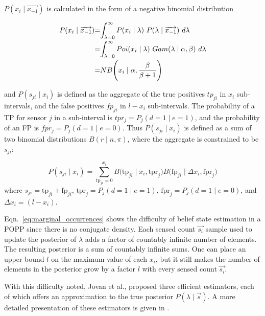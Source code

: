 $P(x_i \mid \overrightarrow{x_{-1}})$ is calculated in the form of a negative binomial distribution

\begin{equation}
	\label{eq:unconditional_xi}
	\begin{tabular}{r@{=}l}
		$P(x_i \mid \overrightarrow{x_{-1}})$ & $\displaystyle\int_{\lambda=0}^{\infty} P(x_i \mid \lambda) ~ P(\lambda \mid \overrightarrow{x_{-1}}) ~d\lambda$ \\ [2ex]
		& $\displaystyle\int_{\lambda=0}^{\infty} Poi(x_i \mid \lambda) ~ Gam(\lambda \mid \alpha, \beta) ~d\lambda$ \\ [2ex]
		& $NB\Bigg(x_i \mid \alpha, \displaystyle\frac{\beta}{\beta + 1}\Bigg)$
	\end{tabular}
\end{equation}

\noindent and $P(s_{ji} \mid x_i)$ is defined as the aggregate of the true positives $tp_{ji}$ in $x_i$ sub-intervals, and the false positives $fp_{ji}$ in $l-x_i$ sub-intervals. The probability of a TP for sensor $j$ in a sub-interval is $tpr_j = P_j(d = 1 \mid e=1)$, and the probability of an FP is $fpr_j = P_j(d = 1 \mid e=0)$. Thus $P(s_{ji} \mid x_i)$ is defined as a sum of two binomial distributions $B(r \mid n,\pi)$, where the aggregate is constrained to be $s_{ji}$: 

\begin{equation}
	\label{eq:joint_binomial_distribution}
    P(s_{ji} \mid x_i) \! = \! \! \! \displaystyle\sum_{\textrm{tp}_{ji} = 0}^{x_{i}} \! \! B\Big(\textrm{tp}_{ji} \mid x_i, \textrm{tpr}_j\Big) B\Big(\textrm{fp}_{ji} \mid \Delta x_i, \textrm{fpr}_j \Big)
\end{equation}
\noindent where $s_{ji} = \textrm{tp}_{ji} + \textrm{fp}_{ji}$, $\textrm{tpr}_j = P_j(d=1 \mid e=1)$, $\textrm{fpr}_j = P_j(d=1 \mid e=0)$, and $\Delta x_i = (l - x_i)$.

Eqn.~\ref{eq:marginal_occurrences} shows the difficulty of belief state estimation in a POPP since there is no conjugate density. Each sensed count $\overrightarrow{s_i}$ sample used to update the posterior of $\lambda$ adds a factor of countably infinite number of elements. The resulting posterior is a sum of countably infinite sums. One can place an upper bound $l$ on the maximum value of each $x_i$, but it still makes the number of elements in the posterior grow by a factor $l$ with every sensed count $\overrightarrow{s_i}$.  

With this difficulty noted, Jovan et al., proposed three efficient estimators, each of which offers an approximation to the true posterior $P(\lambda \mid \overrightarrow{s})$. A more detailed presentation of these estimators is given in \cite{jovan18a}.
